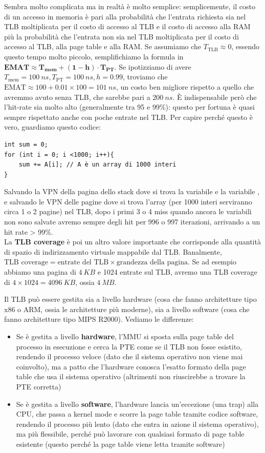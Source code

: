\documentclass[11pt, a4paper, titlepage, oneside]{scrbook}
\begin{document}
Sembra molto complicata ma in realtà è molto semplice: semplicemente, il costo di un accesso in memoria è pari alla probabilità che l'entrata richiesta sia nel TLB moltiplicata per il costo di accesso al TLB e il costo di accesso alla RAM più la probabilità che l'entrata non sia nel TLB moltiplicata per il costo di accesso al TLB, alla page table e alla RAM. Se assumiamo che $T_{\text{TLB}} \approx 0$, essendo questo tempo molto piccolo, semplifichiamo la formula in $\textbf{EMAT} \bm{ \approx T_{\textbf{mem}} + (1-h) \cdot T_{\textbf{PT}}}$. Se ipotizziamo di avere $T_{\text{mem}} = \SI{100}{ns}, T_{\text{PT}} = \SI{100}{ns}, h = 0.99$, troviamo che $\text{EMAT} \approx 100 + 0.01 \times 100 = \SI{101}{ns}$, un costo ben migliore rispetto a quello che avremmo avuto senza TLB, che sarebbe pari a $\SI{200}{ns}$. È indispensabile però che l'hit-rate sia molto alto (generalmente tra 95 e 99\%): questo per fortuna è quasi sempre rispettato anche con poche entrate nel TLB. Per capire perché questo è vero, guardiamo questo codice:
\begin{lstlisting}[style=C]
int sum = 0;
for (int i = 0; i <1000; i++){
    sum += A[i]; // A è un array di 1000 interi 
}
\end{lstlisting}
Salvando la VPN della pagina dello stack dove si trova la variabile  e la variabile , e salvando le VPN delle pagine dove si trova l'array  (per 1000 interi serviranno circa 1 o 2 pagine) nel TLB, dopo i primi 3 o 4 miss quando ancora le variabili non sono salvate avremo sempre degli hit per 996 o 997 iterazioni, arrivando a un hit rate > 99\%. \\
La \textbf{TLB coverage} è poi un altro valore importante che corrisponde alla quantità di spazio di indirizzamento virtuale mappabile dal TLB. Banalmente, $\text{TLB coverage} = \text{entrate del TLB} \times \text{grandezza della pagina}$. Se ad esempio abbiamo una pagina di $\SI{4}{KB}$ e 1024 entrate sul TLB, avremo una TLB coverage di $4 \times 1024 = \SI{4096}{KB}$, ossia $\SI{4}{MB}$. 

Il TLB può essere gestita sia a livello hardware (cosa che fanno architetture tipo x86 o ARM, ossia le architetture più moderne), sia a livello software (cosa che fanno architetture tipo MIPS R2000). Vediamo le differenze:
\begin{itemize}
    \item Se è gestita a livello \textbf{hardware}, l'MMU si sposta sulla page table del processo in esecuzione e cerca la PTE come se il TLB non fosse esistito, rendendo il processo veloce (dato che il sistema operativo non viene mai coinvolto), ma a patto che l'hardware conosca l'esatto formato della page table che usa il sistema operativo (altrimenti non riuscirebbe a trovare la PTE corretta)
    \item Se è gestita a livello \textbf{software}, l'hardware lancia un'eccezione (una trap) alla CPU, che passa a kernel mode e scorre la page table tramite codice software, rendendo il processo più lento (dato che entra in azione il sistema operativo), ma più flessibile, perché può lavorare con qualsiasi formato di page table esistente (questo perché la page table viene letta tramite software)
\end{itemize}
\end{document}

